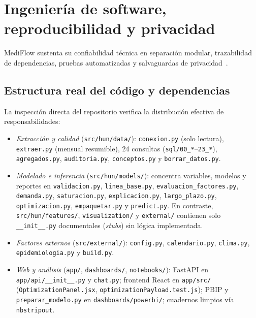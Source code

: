 
\section{Ingeniería de software, reproducibilidad y privacidad}

MediFlow sustenta su confiabilidad técnica en separación modular, trazabilidad de dependencias, pruebas automatizadas y salvaguardas de privacidad~\cite{mediflow2026informe,mediflow2026auditoria}.

\subsection{Estructura real del código y dependencias}

La inspección directa del repositorio verifica la distribución efectiva de responsabilidades:
\begin{itemize}[leftmargin=*,nosep]
\item \textit{Extracción y calidad} (\texttt{src/hun/data/}): \texttt{conexion.py} (solo lectura), \texttt{extraer.py} (mensual resumible), 24 consultas (\texttt{sql/00\_*}--\texttt{23\_*}), \texttt{agregados.py}, \texttt{auditoria.py}, \texttt{conceptos.py} y \texttt{borrar\_datos.py}.
\item \textit{Modelado e inferencia} (\texttt{src/hun/models/}): concentra variables, modelos y reportes en \texttt{validacion.py}, \texttt{linea\_base.py}, \texttt{evaluacion\_factores.py}, \texttt{demanda.py}, \texttt{saturacion.py}, \texttt{explicacion.py}, \texttt{largo\_plazo.py}, \texttt{optimizacion.py}, \texttt{empaquetar.py} y \texttt{predict.py}. En contraste, \texttt{src/hun/features/}, \texttt{visualization/} y \texttt{external/} contienen solo \texttt{\_\_init\_\_.py} documentales (\textit{stubs}) sin lógica implementada.
\item \textit{Factores externos} (\texttt{src/external/}): \texttt{config.py}, \texttt{calendario.py}, \texttt{clima.py}, \texttt{epidemiologia.py} y \texttt{build.py}.
\item \textit{Web y análisis} (\texttt{app/}, \texttt{dashboards/}, \texttt{notebooks/}): FastAPI en \texttt{app/api/\_\_init\_\_.py} y \texttt{chat.py}; frontend React en \texttt{app/src/} (\texttt{OptimizationPanel.jsx}, \texttt{optimizationPayload.test.js}); PBIP y \texttt{preparar\_modelo.py} en \texttt{dashboards/powerbi/}; cuadernos limpios vía \texttt{nbstripout}.
\end{itemize}

